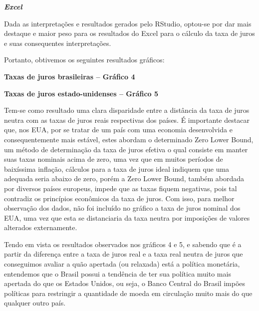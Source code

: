 \noindent 

\noindent \textbf{\textit{Excel}}

\noindent 

Dada as interpreta\c{c}\~{o}es e resultados gerados pelo RStudio, optou-se por dar mais destaque e maior peso para os resultados do Excel para o c\'{a}lculo da taxa de juros e suas consequentes interpreta\c{c}\~{o}es. 

 Portanto, obtivemos os seguintes resultados gr\'{a}ficos: 

\noindent 

\noindent \textbf{Taxas de juros brasileiras -- Gr\'{a}fico 4}

\noindent 


\noindent 

\noindent \textbf{Taxas de juros estado-unidenses -- Gr\'{a}fico 5}


 

Tem-se como resultado uma clara disparidade entre a dist\^{a}ncia da taxa de juros neutra com as taxas de juros reais respectivas dos pa\'{i}ses. \'{E} importante destacar que, nos EUA, por se tratar de um pa\'{i}s com uma economia desenvolvida e consequentemente mais est\'{a}vel, estes abordam o determinado Zero Lower Bound, um m\'{e}todo de determina\c{c}\~{a}o da taxa de juros efetiva o qual consiste em manter suas taxas nominais acima de zero, uma vez que em muitos per\'{i}odos de baix\'{i}ssima infla\c{c}\~{a}o, c\'{a}lculos para a taxa de juros ideal indiquem que uma adequada seria abaixo de zero, por\'{e}m a Zero Lower Bound, tamb\'{e}m abordada por diversos pa\'{i}ses europeus, impede que as taxas fiquem negativas, pois tal contradiz os princ\'{i}pios econ\^{o}micos da taxa de juros. Com isso, para melhor observa\c{c}\~{a}o dos dados, n\~{a}o foi inclu\'{i}do no gr\'{a}fico a taxa de juros nominal dos EUA, uma vez que esta se distanciaria da taxa neutra por imposi\c{c}\~{o}es de valores alterados externamente. 

 Tendo em vista os resultados observados nos gr\'{a}ficos 4 e 5, e sabendo que \'{e} a partir da diferen\c{c}a entre a taxa de juros real e a taxa real neutra de juros que conseguimos avaliar a qu\~{a}o apertada (ou relaxada) est\'{a} a pol\'{i}tica monet\'{a}ria, entendemos que o Brasil possui a tend\^{e}ncia de ter sua pol\'{i}tica muito mais apertada do que os Estados Unidos, ou seja, o Banco Central do Brasil imp\~{o}es pol\'{i}ticas para restringir a quantidade de moeda em circula\c{c}\~{a}o muito mais do que qualquer outro pa\'{i}s. 

